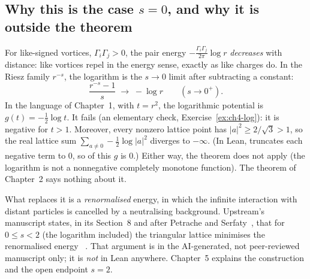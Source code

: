 \subsection{Why this is the case \texorpdfstring{$s=0$}{s = 0}, and why it is outside the theorem}
For like-signed vortices, $\Gamma_i\Gamma_j>0$, the pair energy $-\frac{\Gamma_i\Gamma_j}{2\pi}\log r$
\emph{decreases} with distance: like vortices repel in the energy sense, exactly as like charges do. In the Riesz
family $r^{-s}$, the logarithm is the $s\to 0$ limit after subtracting a constant:
\[
\frac{r^{-s}-1}{s}\;\longrightarrow\;-\log r\qquad (s\to0^+).
\]
In the language of Chapter~1, with $t=r^2$, the logarithmic potential is $g(t)=-\tfrac12\log t$. It fails
 \tierC{} (an elementary check, Exercise~\ref{ex:ch4-log}): it is negative for $t>1$.
Moreover, every nonzero lattice point has $|a|^2\ge2/\sqrt3>1$, so the real lattice sum
$\sum_{a\ne0}-\tfrac12\log|a|^2$ diverges to $-\infty$. (In Lean,  truncates each negative term to
$0$, so  of this $g$ is $0$.) Either way, the theorem does not apply (the logarithm is not a
nonnegative completely monotone function). The theorem of Chapter~2 says nothing about it.

What replaces it is a \emph{renormalised} energy, in which the infinite interaction with distant particles is
cancelled by a neutralising background. Upstream's manuscript states, in its Section~8 and after Petrache and
Serfaty~\cite{ps}, that for $0\le s<2$ (the logarithm included) the triangular lattice minimises the renormalised
energy~\cite{oai} \tierL. That argument is in the AI-generated, not peer-reviewed manuscript only; it is \emph{not}
in Lean anywhere. Chapter~5 explains the construction and the open endpoint $s=2$.

